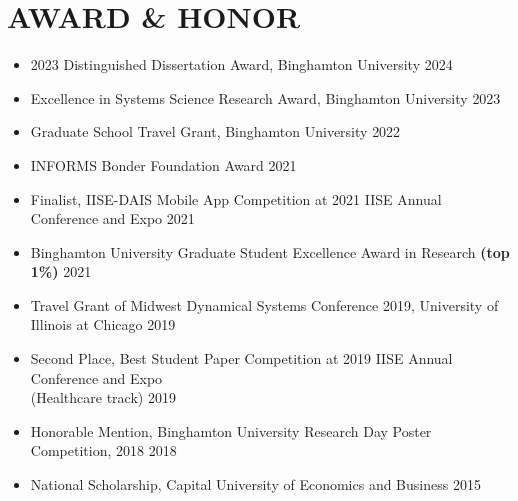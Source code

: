 \documentclass[10pt]{article}
\begin{document}
\section*{AWARD \& HONOR}
\begin{itemize}
	\item 2023 Distinguished Dissertation Award, Binghamton University
	\hfill{2024}
    \item Excellence in Systems Science Research Award, Binghamton University
	\hfill{2023}
    \item Graduate School Travel Grant, Binghamton University
	\hfill{2022}
	\item INFORMS Bonder Foundation Award
	\hfill{2021}
	\item Finalist, IISE-DAIS Mobile App Competition at 2021 IISE Annual Conference and Expo
	\hfill{2021}
	\item Binghamton University Graduate Student Excellence Award in Research \textbf{(top 1\%)}
	\hfill{2021}
	\item Travel Grant of Midwest Dynamical Systems Conference 2019, University of Illinois at Chicago 
	\hfill{2019}
	\item Second Place, Best Student Paper Competition at 2019 IISE Annual Conference and Expo \\(Healthcare track)
	\hfill{2019}
	\item Honorable Mention, Binghamton University Research Day Poster Competition, 2018
	\hfill{2018}
	\item National Scholarship, Capital University of Economics and Business
	\hfill{2015}
\end{itemize}

\end{document}
